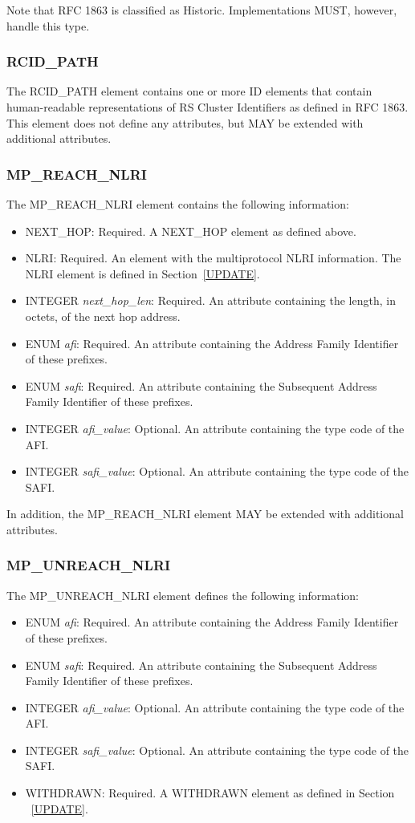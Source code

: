 \documentclass{article}
\begin{document}
Note that RFC 1863 is classified as Historic.  Implementations MUST, however, handle this type.

\subsubsection{RCID_PATH}
The RCID_PATH element contains one or more ID elements that contain human-readable representations of RS Cluster Identifiers as defined in RFC 1863.  This element does not define any attributes, but MAY be extended with additional attributes.

\subsubsection{MP_REACH_NLRI}
The MP_REACH_NLRI element contains the following information:

\begin{itemize}
\item{NEXT_HOP: Required. A NEXT_HOP element as defined above.}
\item{NLRI: Required. An element with the multiprotocol NLRI information.  The NLRI element is defined in Section~\ref{UPDATE}.}
\item{INTEGER \emph{next_hop_len}: Required. An attribute containing the length, in octets, of the next hop address.}
\item{ENUM \emph{afi}: Required. An attribute containing the Address Family Identifier of these prefixes.}
\item{ENUM \emph{safi}: Required. An attribute containing the Subsequent Address Family Identifier of these prefixes.}
\item{INTEGER \emph{afi_value}: Optional. An attribute containing the type code of the AFI.}
\item{INTEGER \emph{safi_value}: Optional. An attribute containing the type code of the SAFI.}
\end{itemize}

In addition, the MP_REACH_NLRI element MAY be extended with additional attributes.

\subsubsection{MP_UNREACH_NLRI}
The MP_UNREACH_NLRI element defines the following information:

\begin{itemize}
\item{ENUM \emph{afi}: Required. An attribute containing the Address Family Identifier of these prefixes.}
\item{ENUM \emph{safi}: Required. An attribute containing the Subsequent Address Family Identifier of these prefixes.}
\item{INTEGER \emph{afi_value}: Optional. An attribute containing the type code of the AFI.}
\item{INTEGER \emph{safi_value}: Optional. An attribute containing the type code of the SAFI.}
\item{WITHDRAWN: Required. A WITHDRAWN element as defined in Section ~\ref{UPDATE}.}
\end{itemize}
\end{document}
